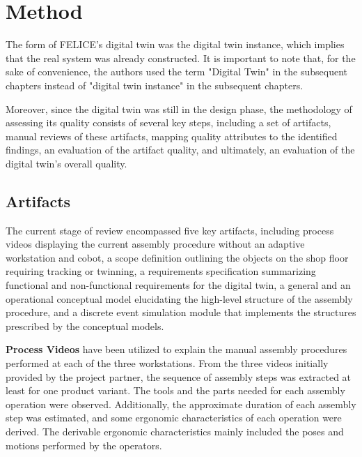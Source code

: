 \documentclass{llncs}
\begin{document}
    \section{Method}
    The form of FELICE's digital twin was the digital twin instance\cite{GrievesVickers2017}, 
    which implies that the real system was already constructed. It is important to note that, for the sake of convenience, the authors used the term "Digital Twin" in the subsequent chapters instead of  "digital twin instance" in the subsequent chapters. 

    Moreover, since the digital twin was still in the design phase, 
    the methodology of assessing its quality consists of several key steps,
    including a set of artifacts, manual reviews of these artifacts, 
    mapping quality attributes to the identified findings, an evaluation of the artifact quality, and ultimately, 
    an evaluation of the digital twin's overall quality.
    \subsection{Artifacts}\label{section:Artifacts}
    The current stage of review encompassed five key artifacts,
    including process videos displaying the current assembly procedure without an adaptive workstation and cobot,
    a scope definition outlining the objects on the shop floor requiring tracking or twinning, a requirements 
    specification summarizing functional and non-functional requirements for the digital twin, a general and an operational 
    conceptual model elucidating the high-level structure of the assembly procedure, 
    and a discrete event simulation module that implements the structures prescribed by the conceptual models.

    \textbf{Process Videos} have been utilized to explain the manual assembly procedures performed at each of the three workstations. From the three videos initially provided by the project partner,  
    the sequence of assembly steps was extracted at least for one product variant. The tools and the parts needed for each assembly operation were observed. Additionally, the approximate duration of each assembly step 
    was estimated, and some ergonomic characteristics of each operation were derived. 
    The derivable ergonomic characteristics mainly included the poses and motions performed by the operators.
\end{document}
